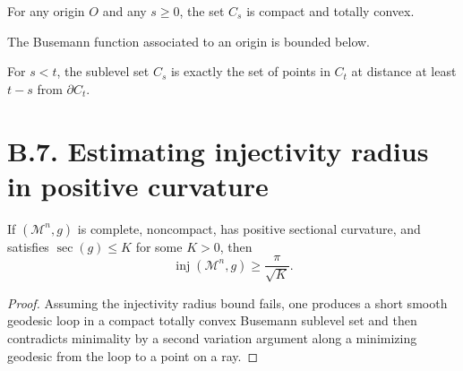 \begin{proposition}
\label{appb-prop-busemann-sublevel-compact-convex}
For any origin $O$ and any $s\ge 0$, the set $C_s$ is compact and totally convex.
\end{proposition}

\begin{corollary}
\label{appb-cor-busemann-below}
The Busemann function associated to an origin is bounded below.
\end{corollary}

\begin{proposition}
\label{appb-prop-busemann-level-sets-parallel}
For $s<t$, the sublevel set $C_s$ is exactly the set of points in $C_t$ at distance at least $t-s$ from $\partial C_t$.
\end{proposition}

\section*{B.7. Estimating injectivity radius in positive curvature}

\begin{theorem}
\label{appb-thm-inj-radius-positive-curvature}
If $(\mathcal M^n,g)$ is complete, noncompact, has positive sectional curvature, and satisfies $\sec(g)\le K$ for some $K>0$, then
\[
\operatorname{inj}(\mathcal M^n,g)\ge \frac{\pi}{\sqrt K}.
\]
\end{theorem}

\begin{proof}
\sketch Assuming the injectivity radius bound fails, one produces a short smooth geodesic loop in a compact totally convex Busemann sublevel set and then contradicts minimality by a second variation argument along a minimizing geodesic from the loop to a point on a ray.
\end{proof}

